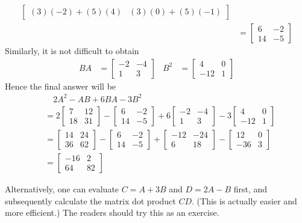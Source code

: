 \begin{solution}
\begin{align*}
\begin{bmatrix}
(3)(-2)+(5)(4) & (3)(0)+(5)(-1) 
\end{bmatrix} \\
&= 
\begin{bmatrix}
6 & -2 \\
14 & -5 
\end{bmatrix}
\end{align*}
Similarly, it is not difficult to obtain
\begin{align*}
BA &= 
\begin{bmatrix}
-2 & -4 \\
1 & 3 
\end{bmatrix} &
B^2 &= 
\begin{bmatrix}
4 & 0 \\
-12 & 1 
\end{bmatrix} 
\end{align*}
Hence the final answer will be
\begin{align*}
&\quad 2A^2 - AB + 6BA - 3B^2 \\
&= 
2\begin{bmatrix}
7 & 12 \\
18 & 31 
\end{bmatrix}
-\begin{bmatrix}
6 & -2 \\
14 & -5 
\end{bmatrix}
+6\begin{bmatrix}
-2 & -4 \\
1 & 3 
\end{bmatrix}
-3\begin{bmatrix}
4 & 0 \\
-12 & 1 
\end{bmatrix} \\
&=
\begin{bmatrix}
14 & 24 \\
36 & 62 
\end{bmatrix}
-\begin{bmatrix}
6 & -2 \\
14 & -5 
\end{bmatrix}
+\begin{bmatrix}
-12 & -24 \\
6 & 18 
\end{bmatrix}
-\begin{bmatrix}
12 & 0 \\
-36 & 3 
\end{bmatrix} \\
&= 
\begin{bmatrix}
-16 & 2 \\
64 & 82 
\end{bmatrix}
\end{align*}
\end{solution}
Alternatively, one can evaluate $C = A+3B$ and $D = 2A-B$ first, and subsequently calculate the matrix dot product $CD$. (This is actually easier and more efficient.) The readers should try this as an exercise.

